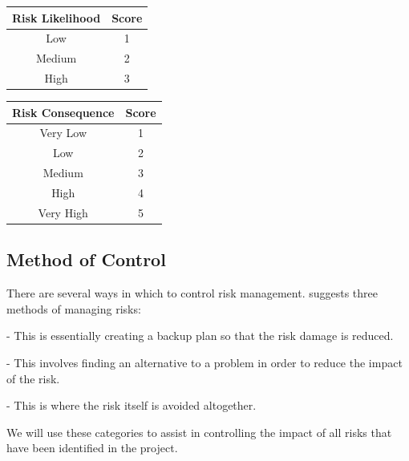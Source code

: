 \documentclass{article}
\begin{document}
\begin{multicols}{2}
    \begin{center}
    
        \vspace{0.1cm}
        \centering
        \begin{tabular}{|c|c|} \hline
            \textbf{Risk Likelihood} & \textbf{Score} \\
            \hline
            Low & 1 \\ \hline
            Medium & 2 \\ \hline
            High & 3 \\ \hline
        \end{tabular}
    \end{center}
    
    \begin{center}
        \vspace{0.1cm}
        \centering
        \begin{tabular}{|c|c|} \hline
            \textbf{Risk Consequence} & \textbf{Score} \\ \hline
            Very Low & 1 \\ \hline
            Low & 2 \\ \hline
            Medium & 3 \\ \hline
            High & 4 \\ \hline
            Very High & 5 \\ \hline
        \end{tabular}
    \end{center}
\end{multicols}

\begin{multicols}{2}
\end{multicols}

\par
\subsection{Method of Control}
There are several ways in which to control risk management. \textcite[][87]{dawson15} suggests three methods of managing risks:
\begin{description}[labelindent=\parindent]
    \item[Contingency] - This is essentially creating a backup plan so that the risk damage is reduced.
    \item[Deflection] - This involves finding an alternative to a problem in order to reduce the impact of the risk.
    \item[Avoidance] - This is where the risk itself is avoided altogether.
\end{description}
We will use these categories to assist in controlling the impact of all risks that have been identified in the project.
\par
\end{document}
